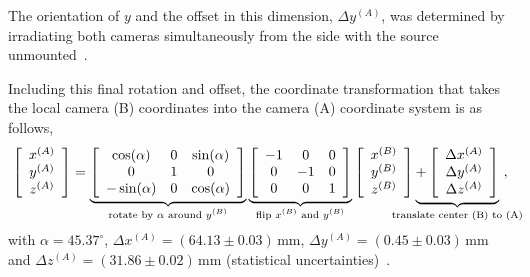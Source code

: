The orientation of $y$ and the offset in this dimension, $\Delta y^{(A)}$, was determined by irradiating both cameras simultaneously from the side with the \CsS{} source unmounted~\cite{alignment_jan}.

Including this final rotation and offset, the coordinate transformation that takes the local camera (B) coordinates into the camera (A) coordinate system is as follows, 
\begin{equation}
     \left[\begin{array}{c} x^{(A)} \\ y^{(A)} \\ z^{(A)} \end{array}\right] = \underbrace{\left[\begin{array}{ccc} \cos(\alpha) &0 & \sin(\alpha) \\ 0 & 1 & 0 \\ -\sin(\alpha) & 0 & \cos(\alpha) \end{array}\right]}_\text{rotate by $\alpha$ around $y^{(B)}$} \underbrace{\left[\begin{array}{ccc} -1 & 0 & 0\\ 0 & -1 & 0 \\0 & 0 & 1 \end{array}\right]}_{\text{flip $x^{(B)}$ and $y^{(B)}$}} \left[\begin{array}{c} x^{(B)} \\ y^{(B)} \\ z^{(B)} \end{array}\right] \underbrace{+ \left[\begin{array}{c} \Delta x^{(A)} \\ \Delta y^{(A)} \\\Delta z^{(A)} \end{array} \right]}_{\makebox(0,0){$\scriptstyle \text{translate center (B) to (A)}$}}~, \label{eq:czt_relative3D}
\end{equation}
with $\alpha = 45.37^\circ$, $\Delta x^{(A)} = (64.13\pm0.03)\,\text{mm}$, $\Delta y^{(A)} = (0.45\pm0.03)\,\text{mm}$ and $\Delta z^{(A)} = (31.86\pm0.02)\,\text{mm}$ (statistical uncertainties)~\cite{felix_comm}.


